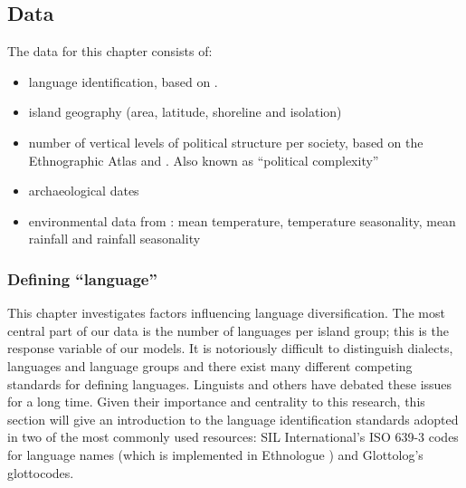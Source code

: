 \documentclass[a4paper,10pt]{article} %
\begin{document}
\subsection{Data}
The data for this chapter consists of:

\begin{itemize}
\item language identification, based on \citet{glottolog40}.
\item island geography (area, latitude, shoreline and isolation)
\item number of vertical levels of political structure per society, based on the Ethnographic Atlas \citep{gray1998ethnographic, d_place_all} and \citet{sheehan2018coevolution}. Also known as ``political complexity''
\item archaeological dates \citep{intoh2007reconnaissance, intoh2008ongoing, rieth_cochrane_2018, levin_seikel_miles_2019, pol_outliers_stat_art, Napolitano_et_al_yap}
\item environmental data from \citet{ecoclimate}: mean temperature, temperature seasonality, mean rainfall and rainfall seasonality
\end{itemize}



\subsubsection{Defining ``language''}
\label{sec:language_class}
This chapter investigates factors influencing language diversification. The most central part of our data is the number of languages per island group; this is the response variable of our models. It is notoriously difficult to distinguish dialects, languages and language groups and there exist many different competing standards for defining languages. Linguists and others have debated these issues for a long time. Given their importance and centrality to this research, this section will give an introduction to the language identification standards adopted in two of the most commonly used resources: SIL International's ISO 639-3 codes for language names (which is implemented in Ethnologue \citep{ethnologue22}) and Glottolog's glottocodes.
\end{document}
